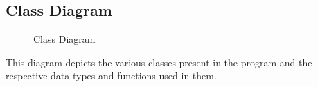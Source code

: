 \documentclass[oneside,a4paper,12pt]{report}
\begin{document}
\subsection{Class Diagram}
 \begin{center}
	\begin{figure}[!htbp]
		\centering
	  \caption{Class Diagram}
	  \label{fig:class-dig}
	\end{figure}
\end{center} 
This diagram depicts the various classes present in the program and the respective data types and functions used in them.
\end{document}
